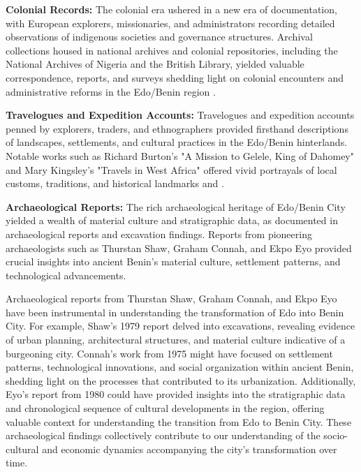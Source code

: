 \textbf{Colonial Records:} The colonial era ushered in a new era of documentation, with European explorers, missionaries, and administrators recording detailed observations of indigenous societies and governance structures. Archival collections housed in national archives and colonial repositories, including the National Archives of Nigeria and the British Library, yielded valuable correspondence, reports, and surveys shedding light on colonial encounters and administrative reforms in the Edo/Benin region \cite{oliver1985}.

\textbf{Travelogues and Expedition Accounts:} Travelogues and expedition accounts penned by explorers, traders, and ethnographers provided firsthand descriptions of landscapes, settlements, and cultural practices in the Edo/Benin hinterlands. Notable works such as Richard Burton's "A Mission to Gelele, King of Dahomey" and Mary Kingsley's "Travels in West Africa" offered vivid portrayals of local customs, traditions, and historical landmarks\cite{burton2011} and \cite{kingsley1988}.

\textbf{Archaeological Reports:} The rich archaeological heritage of Edo/Benin City yielded a wealth of material culture and stratigraphic data, as documented in archaeological reports and excavation findings. Reports from pioneering archaeologists such as Thurstan Shaw, Graham Connah, and Ekpo Eyo provided crucial insights into ancient Benin's material culture, settlement patterns, and technological advancements\cite{shaw1970,connah1975}.

Archaeological reports from Thurstan Shaw, Graham Connah, and Ekpo Eyo have been instrumental in understanding the transformation of Edo into Benin City. For example, Shaw's 1979 report delved into excavations, revealing evidence of urban planning, architectural structures, and material culture indicative of a burgeoning city. Connah's work from 1975 might have focused on settlement patterns, technological innovations, and social organization within ancient Benin, shedding light on the processes that contributed to its urbanization. Additionally, Eyo's report from 1980 could have provided insights into the stratigraphic data and chronological sequence of cultural developments in the region, offering valuable context for understanding the transition from Edo to Benin City. These archaeological findings collectively contribute to our understanding of the socio-cultural and economic dynamics accompanying the city's transformation over time.

